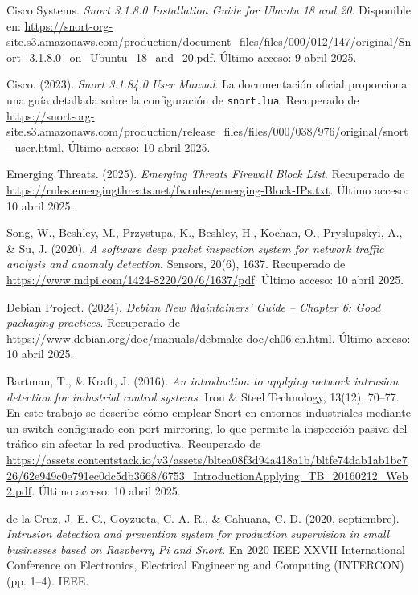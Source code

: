 \documentclass[11pt,a4paper,twoside]{report}
\begin{document}
\begin{thebibliography}{35}
	Cisco Systems. \textit{Snort 3.1.8.0 Installation Guide for Ubuntu 18 and 20}. Disponible en: \url{https://snort-org-site.s3.amazonaws.com/production/document_files/files/000/012/147/original/Snort_3.1.8.0_on_Ubuntu_18_and_20.pdf}. Último acceso: 9 abril 2025.
	
	Cisco. (2023). \textit{Snort 3.1.84.0 User Manual}. La documentación oficial proporciona una guía detallada sobre la configuración de \texttt{snort.lua}. Recuperado de \url{https://snort-org-site.s3.amazonaws.com/production/release_files/files/000/038/976/original/snort_user.html}. Último acceso: 10 abril 2025.
	
	 Emerging Threats. (2025). \textit{Emerging Threats Firewall Block List}. Recuperado de \url{https://rules.emergingthreats.net/fwrules/emerging-Block-IPs.txt}. Último acceso: 10 abril 2025.
	
	Song, W., Beshley, M., Przystupa, K., Beshley, H., Kochan, O., Pryslupskyi, A., \& Su, J. (2020). \textit{A software deep packet inspection system for network traffic analysis and anomaly detection}. Sensors, 20(6), 1637. Recuperado de \url{https://www.mdpi.com/1424-8220/20/6/1637/pdf}. Último acceso: 10 abril 2025.
	
	Debian Project. (2024). \textit{Debian New Maintainers’ Guide – Chapter 6: Good packaging practices}. Recuperado de \url{https://www.debian.org/doc/manuals/debmake-doc/ch06.en.html}. Último acceso: 10 abril 2025.
	
	Bartman, T., \& Kraft, J. (2016). \textit{An introduction to applying network intrusion detection for industrial control systems}. Iron \& Steel Technology, 13(12), 70--77. En este trabajo se describe cómo emplear Snort en entornos industriales mediante un switch configurado con port mirroring, lo que permite la inspección pasiva del tráfico sin afectar la red productiva. Recuperado de \url{https://assets.contentstack.io/v3/assets/bltea08f3d94a418a1b/bltfe74dab1ab1bc726/62e949c0e791ec0dc5db3668/6753_IntroductionApplying_TB_20160212_Web2.pdf}. Último acceso: 10 abril 2025.
	
	de la Cruz, J. E. C., Goyzueta, C. A. R., \& Cahuana, C. D. (2020, septiembre). \textit{Intrusion detection and prevention system for production supervision in small businesses based on Raspberry Pi and Snort}. En 2020 IEEE XXVII International Conference on Electronics, Electrical Engineering and Computing (INTERCON) (pp. 1–4). IEEE.
	
\end{thebibliography}
\end{document}
